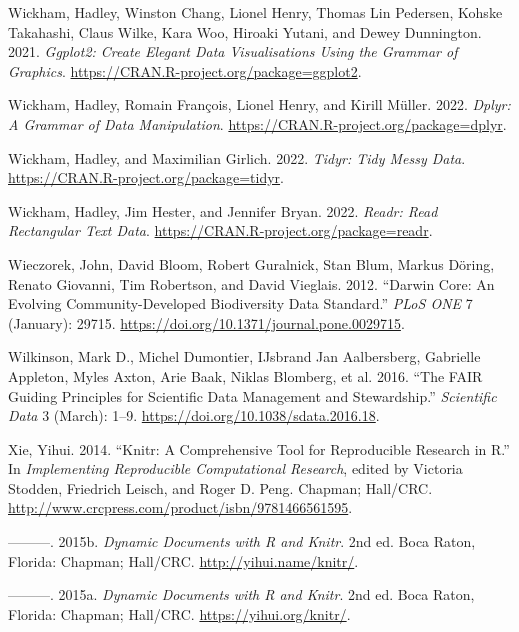 \documentclass[
]{book}
\newlength{\cslhangindent}
\newlength{\cslentryspacingunit} %
\newenvironment{CSLReferences}[2] %
 {%
  \setlength{\parindent}{0pt}
  \ifodd #1
  \let\oldpar\par
  \def\par{\hangindent=\cslhangindent\oldpar}
  \fi
  \setlength{\parskip}{#2\cslentryspacingunit}
 }%
 {}
\begin{document}
\begin{CSLReferences}{1}{0}
\leavevmode{}%
Wickham, Hadley, Winston Chang, Lionel Henry, Thomas Lin Pedersen, Kohske Takahashi, Claus Wilke, Kara Woo, Hiroaki Yutani, and Dewey Dunnington. 2021. \emph{Ggplot2: Create Elegant Data Visualisations Using the Grammar of Graphics}. \url{https://CRAN.R-project.org/package=ggplot2}.

\leavevmode{}%
Wickham, Hadley, Romain François, Lionel Henry, and Kirill Müller. 2022. \emph{Dplyr: A Grammar of Data Manipulation}. \url{https://CRAN.R-project.org/package=dplyr}.

\leavevmode{}%
Wickham, Hadley, and Maximilian Girlich. 2022. \emph{Tidyr: Tidy Messy Data}. \url{https://CRAN.R-project.org/package=tidyr}.

\leavevmode{}%
Wickham, Hadley, Jim Hester, and Jennifer Bryan. 2022. \emph{Readr: Read Rectangular Text Data}. \url{https://CRAN.R-project.org/package=readr}.

\leavevmode{}%
Wieczorek, John, David Bloom, Robert Guralnick, Stan Blum, Markus Döring, Renato Giovanni, Tim Robertson, and David Vieglais. 2012. {``Darwin Core: An Evolving Community-Developed Biodiversity Data Standard.''} \emph{PLoS ONE} 7 (January): 29715. \url{https://doi.org/10.1371/journal.pone.0029715}.

\leavevmode{}%
Wilkinson, Mark D., Michel Dumontier, IJsbrand Jan Aalbersberg, Gabrielle Appleton, Myles Axton, Arie Baak, Niklas Blomberg, et al. 2016. {``The FAIR Guiding Principles for Scientific Data Management and Stewardship.''} \emph{Scientific Data} 3 (March): 1--9. \url{https://doi.org/10.1038/sdata.2016.18}.

\leavevmode{}%
Xie, Yihui. 2014. {``Knitr: A Comprehensive Tool for Reproducible Research in {R}.''} In \emph{Implementing Reproducible Computational Research}, edited by Victoria Stodden, Friedrich Leisch, and Roger D. Peng. Chapman; Hall/CRC. \url{http://www.crcpress.com/product/isbn/9781466561595}.

\leavevmode{}%
---------. 2015b. \emph{Dynamic Documents with {R} and Knitr}. 2nd ed. Boca Raton, Florida: Chapman; Hall/CRC. \url{http://yihui.name/knitr/}.

\leavevmode{}%
---------. 2015a. \emph{Dynamic Documents with {R} and Knitr}. 2nd ed. Boca Raton, Florida: Chapman; Hall/CRC. \url{https://yihui.org/knitr/}.


\end{CSLReferences}
\end{document}
